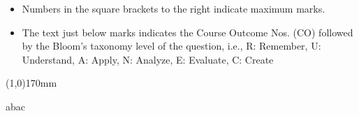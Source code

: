 \documentclass[addpoints,12pt]{exam}
\begin{document}
  \begin{itemize}[leftmargin=4mm,rightmargin=-2cm]
      \item Numbers in the square brackets to the right indicate maximum marks.
     
      \item The text just below marks indicates the Course Outcome Nos. (CO) followed by the Bloom’s taxonomy level of the question, i.e., R: Remember, U: Understand, A: Apply, N: Analyze, E: Evaluate, C: Create
  \end{itemize}
  \line(1,0){170mm}
 \vspace{5mm}
\begin{questions}
\pointname{}
\pointsinrightmargin
\pointformat{\parbox[t]{16pt}{\text{[\thepoints]}}}\question[5]
abac

\vspace{1.5mm}
\end{questions}
\end{document}
